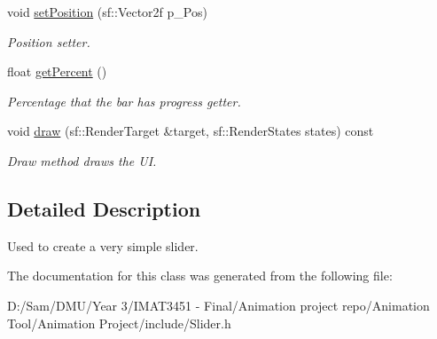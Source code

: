 \begin{DoxyCompactItemize}
\mbox{\label{class_slider_a1d3ab32779278798ccb2410648282036}} 
void \hyperlink{class_slider_a1d3ab32779278798ccb2410648282036}{set\+Position} (sf\+::\+Vector2f p\+\_\+\+Pos)
\begin{DoxyCompactList}\small\item\em Position setter. \end{DoxyCompactList}\item 
\mbox{\label{class_slider_ab49809e3c428a3c3783efd49a148c6f7}} 
float \hyperlink{class_slider_ab49809e3c428a3c3783efd49a148c6f7}{get\+Percent} ()
\begin{DoxyCompactList}\small\item\em Percentage that the bar has progress getter. \end{DoxyCompactList}\item 
\mbox{\label{class_slider_aab959e9d386bd5e6f7953ad11cbd49f6}} 
void \hyperlink{class_slider_aab959e9d386bd5e6f7953ad11cbd49f6}{draw} (sf\+::\+Render\+Target \&target, sf\+::\+Render\+States states) const
\begin{DoxyCompactList}\small\item\em Draw method draws the UI. \end{DoxyCompactList}\end{DoxyCompactItemize}


\subsection{Detailed Description}
Used to create a very simple slider. 

The documentation for this class was generated from the following file\+:\begin{DoxyCompactItemize}
\item 
D\+:/\+Sam/\+D\+M\+U/\+Year 3/\+I\+M\+A\+T3451 -\/ Final/\+Animation project repo/\+Animation Tool/\+Animation Project/include/Slider.\+h\end{DoxyCompactItemize}
